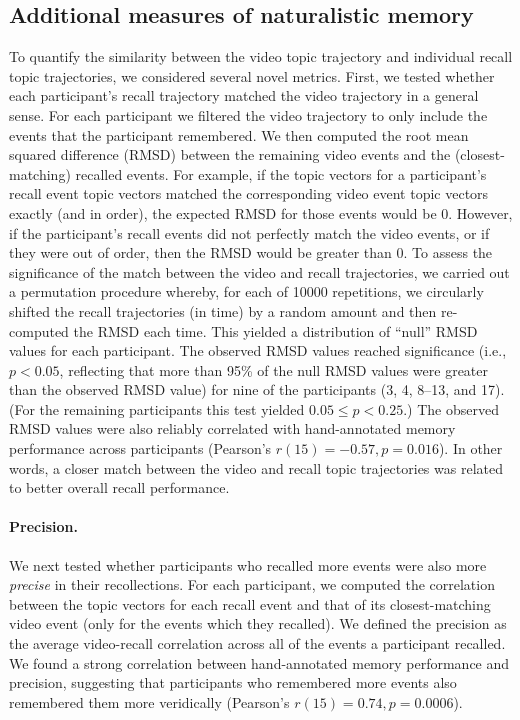 \documentclass{article}
\begin{document}
\subsection*{Additional measures of naturalistic memory}
To quantify the similarity between the video topic trajectory and individual recall topic trajectories, we considered several novel metrics.  First, we tested whether each participant's recall trajectory matched the video trajectory in a general sense. For each participant we filtered the video trajectory to only include the events that the participant remembered.  We then computed the root mean squared difference (RMSD) between the remaining video events and the (closest-matching) recalled events.  For example, if the topic vectors for a participant's recall event topic vectors matched the corresponding video event topic vectors exactly (and in order), the expected RMSD for those events would be 0.  However, if the participant's recall events did not perfectly match the video events, or if they were out of order, then the RMSD would be greater than 0.  To assess the significance of the match between the video and recall trajectories, we carried out a permutation procedure whereby, for each of 10000 repetitions, we circularly shifted the recall trajectories (in time) by a random amount and then re-computed the RMSD each time.  This yielded a distribution of ``null'' RMSD values for each participant.  The observed RMSD values reached significance (i.e., $p < 0.05$, reflecting that more than 95\% of the null RMSD values were greater than the observed RMSD value) for nine of the participants (3, 4, 8--13, and 17).  (For the remaining participants this test yielded $0.05 \leq p < 0.25$.)  The observed RMSD values were also reliably correlated with hand-annotated memory performance across participants (Pearson's $r(15) = -0.57, p = 0.016$).  In other words, a closer match between the video and recall topic trajectories was related to better overall recall performance.

\paragraph*{Precision.}
We next tested whether participants who recalled more events were also more \textit{precise} in their recollections. For each participant, we computed the correlation between the topic vectors for each recall event and that of its closest-matching video event (only for the events which they recalled). We defined the precision as the average video-recall correlation across all of the events a participant recalled.  We found a strong correlation between hand-annotated memory performance and precision, suggesting that participants who remembered more events also remembered them more veridically (Pearson's $r(15) = 0.74, p = 0.0006$).
\end{document}
